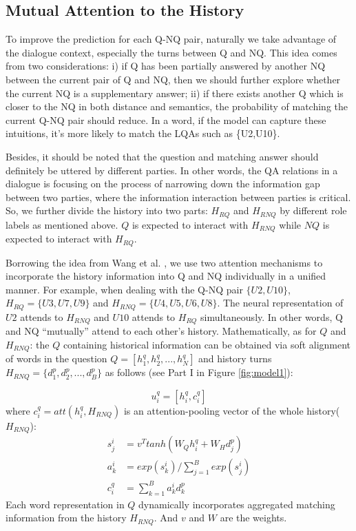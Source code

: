 \subsection{Mutual Attention to the History}
\label{sec:mutual attention}
To improve the prediction for each Q-NQ pair, 
naturally we take advantage of the dialogue context, 
especially the turns between Q and NQ. 
This idea comes from two considerations: i) if Q has been partially answered 
by another NQ between the current pair of Q and NQ, then we should further explore 
whether the current NQ is a supplementary answer; ii) if there exists another Q which is closer 
to the NQ in both distance and semantics, the probability of matching 
the current Q-NQ pair should reduce. In a word, 
if the model can capture these intuitions, it's more likely to match 
the LQAs such as \{U2,U10\}.

Besides, it should be noted that the question and matching answer should
definitely be uttered by different parties. 
In other words, the QA relations in a dialogue is focusing 
on the process of narrowing down the information gap between two parties, 
where the information interaction between parties is critical. 
So, we further divide the history into two parts: 
$H_{RQ}$ and $H_{RNQ}$ by different role labels as mentioned above. 
$Q$ is expected to interact with $H_{RNQ}$ while $NQ$ is expected to interact with $H_{RQ}$.

Borrowing the idea from Wang et al. , we use two attention mechanisms to incorporate the history information into Q and NQ individually in a unified manner. For example, when dealing with the Q-NQ pair $\{U2,U10\}$, $H_{RQ}=\{U3,U7,U9\}$ and $H_{RNQ}=\{U4,U5,U6,U8\}$. The neural representation of $U2$ attends to $H_{RNQ}$ and $U10$ attends to $H_{RQ}$ simultaneously.
In other words, Q and NQ ``mutually'' attend to each other's history. Mathematically, as for $Q$ and $H_{RNQ}$: the $Q$ containing historical information can be obtained  via soft alignment of words in the question $Q=[h^q_1,h^q_2,...,h^q_N]$ and history turns $H_{RNQ}=\{d^p_1,d^p_2,...,d^p_B\}$ as follows (see Part I in Figure \ref{fig:model1}):

\begin{equation}
u^q_i=[h^q_i,c^q_i]
\end{equation}
where $c^q_i=att(h^q_i,H_{RNQ})$ is an attention-pooling vector of the whole history($H_{RNQ}$):
\begin{equation}
\begin{aligned}
s^i_j&=v^Ttanh(W_Qh^q_i+W_Hd^p_j)\\
a^i_k&=exp(s^i_k)/\sum_{j=1}^Bexp(s^i_j)\\
c^q_i&=\sum_{k=1}^Ba^i_kd^p_k
\end{aligned}
\end{equation}
Each word representation in $Q$ dynamically incorporates aggregated matching information from the history $H_{RNQ}$. And $v$ and $W$ are the weights.

